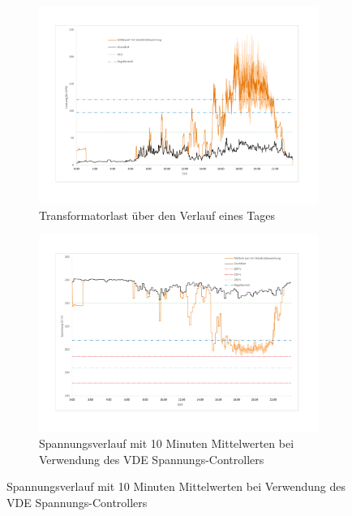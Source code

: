 \begin{figure}
	\begin{subfigure}{\linewidth}
		\includegraphics[scale=0.5]{img/SA_par/TrafoLast2.pdf}
		\caption{Transformatorlast über den Verlauf eines Tages}
		\label{Abb_SAparTrafoLast}
	\end{subfigure}
	\begin{subfigure}{\linewidth}
		\includegraphics[scale=0.5]{img/SA_par/Voltage2.pdf}
		\caption{Spannungsverlauf mit 10 Minuten Mittelwerten bei Verwendung des VDE Spannungs-Controllers}
		\label{Abb_SAparSpannung}
	\end{subfigure}
\end{figure}

